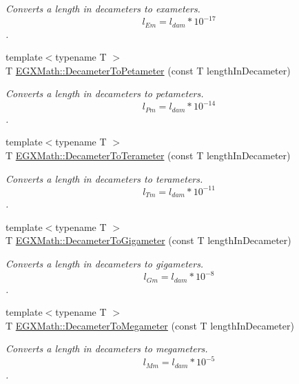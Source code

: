 \begin{DoxyCompactItemize}
\begin{DoxyCompactList}\small\item\em Converts a length in decameters to exameters. \[ l_{Em}=l_{dam} * 10^{-17} \]. \end{DoxyCompactList}\item 
{\footnotesize template$<$typename T $>$ }\\T \mbox{\hyperlink{group___e_g_x_math-_conversions-_length_conversions-_s_i-_decameter-_s_i_ga0475fbe33c57dc772e3121f776d82fd0}{E\+G\+X\+Math\+::\+Decameter\+To\+Petameter}} (const T length\+In\+Decameter)
\begin{DoxyCompactList}\small\item\em Converts a length in decameters to petameters. \[ l_{Pm}=l_{dam} * 10^{-14} \]. \end{DoxyCompactList}\item 
{\footnotesize template$<$typename T $>$ }\\T \mbox{\hyperlink{group___e_g_x_math-_conversions-_length_conversions-_s_i-_decameter-_s_i_ga94859159b401c261bf562ab4e3071508}{E\+G\+X\+Math\+::\+Decameter\+To\+Terameter}} (const T length\+In\+Decameter)
\begin{DoxyCompactList}\small\item\em Converts a length in decameters to terameters. \[ l_{Tm}=l_{dam} * 10^{-11} \]. \end{DoxyCompactList}\item 
{\footnotesize template$<$typename T $>$ }\\T \mbox{\hyperlink{group___e_g_x_math-_conversions-_length_conversions-_s_i-_decameter-_s_i_gaa889b61d8f9874010be977ce71b4dfaf}{E\+G\+X\+Math\+::\+Decameter\+To\+Gigameter}} (const T length\+In\+Decameter)
\begin{DoxyCompactList}\small\item\em Converts a length in decameters to gigameters. \[ l_{Gm}=l_{dam} * 10^{-8} \]. \end{DoxyCompactList}\item 
{\footnotesize template$<$typename T $>$ }\\T \mbox{\hyperlink{group___e_g_x_math-_conversions-_length_conversions-_s_i-_decameter-_s_i_ga84e31290bf0886972b10479e4fd37fb4}{E\+G\+X\+Math\+::\+Decameter\+To\+Megameter}} (const T length\+In\+Decameter)
\begin{DoxyCompactList}\small\item\em Converts a length in decameters to megameters. \[ l_{Mm}=l_{dam} * 10^{-5} \]. \end{DoxyCompactList}\item 

\end{DoxyCompactItemize}
